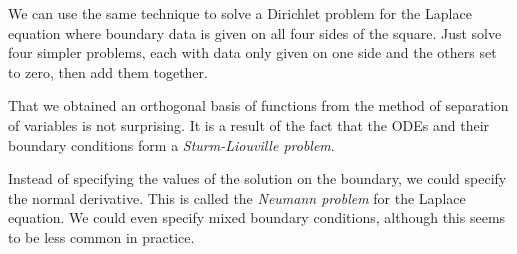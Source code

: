 \begin{remark}
We can use the same technique to solve a Dirichlet problem for the Laplace equation where boundary data is given on all four sides of the square. Just solve four simpler problems, each with data only given on one side and the others set to zero, then add them together.
\end{remark}

\begin{remark}
That we obtained an orthogonal basis of functions from the method of separation of variables is not surprising. It is a result of the fact that the ODEs and their boundary conditions form a \emph{Sturm-Liouville problem}.
\end{remark}

\begin{remark}
Instead of specifying the values of the solution on the boundary, we could specify the normal derivative. This is called the \emph{Neumann problem} for the Laplace equation. We could even specify mixed boundary conditions, although this seems to be less common in practice.
\end{remark}

